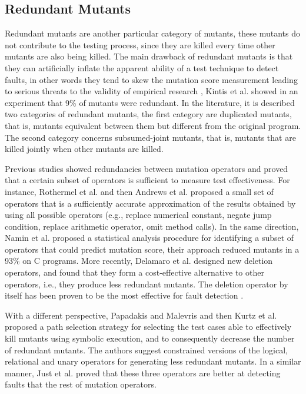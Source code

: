 
\subsection{Redundant Mutants}
\label{sec:opt:redundant}

Redundant mutants are another particular category of mutants, these mutants do not contribute to the testing process, since they are killed every time other mutants are also being killed. The main drawback of redundant mutants is that they can artificially inflate the apparent ability of a test technique to detect faults, in other words they tend to skew the mutation score measurement leading to serious threats to the validity of empirical research \cite{papadakis2016threats}, Kintis et al. \cite{kintis2010evaluating} showed in an experiment that 9\% of mutants were redundant. In the literature, it is described two categories of redundant mutants, the first category are duplicated mutants, that is, mutants equivalent between them but different from the original program. The second category concerns subsumed-joint mutants, that is, mutants that are killed jointly when other mutants are killed.

Previous studies showed redundancies between mutation operators and proved that a certain subset of operators is sufficient to measure test effectiveness. For instance, Rothermel et al. \cite{rothermel1996experimental} and then Andrews et al. \cite{andrews2005mutation} proposed a small set of operators that is a sufficiently accurate approximation of the results obtained by using all possible operators (e.g., replace numerical constant, negate jump condition, replace arithmetic operator, omit method calls). In the same direction, Namin et al. \cite{siami2008sufficient} proposed a statistical analysis procedure for identifying a subset of operators that could predict mutation score, their approach reduced mutants in a 93\% on C programs. 
More recently, Delamaro et al. \cite{delamaro2014designing} designed new deletion operators, and found that they form a cost-effective alternative to other operators, i.e., they produce less redundant mutants. The deletion operator by itself has been proven to be the most effective for fault detection \cite{delamaro2014designing}.

With a different perspective, Papadakis and Malevris \cite{papadakis2012mutation} and then Kurtz et al. \cite{kurtz2015static} proposed a path selection strategy for selecting the test cases able to effectively kill mutants using symbolic execution, and to consequently decrease the number of redundant mutants. The authors suggest constrained versions of the logical, relational and unary operators for generating less redundant mutants. In a similar manner, Just et al. \cite{just2012redundant,just2015higher} proved that these three operators are better at detecting faults that the rest of mutation operators.

